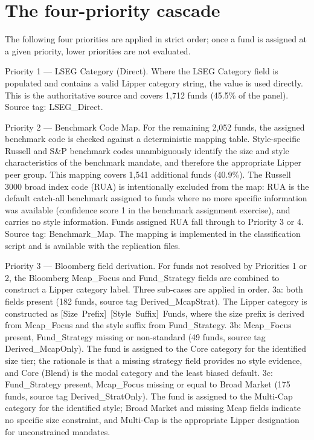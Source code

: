 \documentclass[12pt, oneside]{report}
\begin{document}
\section{The four-priority cascade}
\label{sec:lipper_cascade}

\noindent The following four priorities are applied in strict order;
once a fund is assigned at a given priority, lower priorities are
not evaluated.

Priority 1 --- LSEG Category (Direct). Where the LSEG
Category field is populated and contains a valid Lipper category
string, the value is used directly. This is the authoritative source
and covers 1{,}712 funds (45.5\% of the panel). Source tag:
LSEG\_Direct.

Priority 2 --- Benchmark Code Map. For the remaining 2{,}052
funds, the assigned benchmark code is checked against a deterministic
mapping table. Style-specific Russell and S\&P benchmark codes
unambiguously identify the size and style characteristics of the
benchmark mandate, and therefore the appropriate Lipper peer group.
This mapping covers 1{,}541 additional funds (40.9\%). The Russell
3000 broad index code (RUA) is intentionally excluded from the map:
RUA is the default catch-all benchmark assigned to funds where no
more specific information was available (confidence score 1 in the
benchmark assignment exercise), and carries no style information.
Funds assigned RUA fall through to Priority 3 or 4. Source tag:
Benchmark\_Map. The mapping is implemented in the classification
script and is available with the replication files.

Priority 3 --- Bloomberg field derivation. For funds not
resolved by Priorities 1 or 2, the Bloomberg Mcap\_Focus and
Fund\_Strategy fields are combined to construct a Lipper
category label. Three sub-cases are applied in order. 3a:
both fields present (182 funds, source tag
Derived\_McapStrat). The Lipper category is constructed as
[Size~Prefix]~[Style~Suffix]~Funds, where the size prefix is derived
from Mcap\_Focus and the style suffix from
Fund\_Strategy. 3b: Mcap\_Focus present,
Fund\_Strategy missing or non-standard (49 funds, source tag
Derived\_McapOnly). The fund is assigned to the Core
category for the identified size tier; the rationale is that a
missing strategy field provides no style evidence, and Core (Blend)
is the modal category and the least biased default. 3c:
Fund\_Strategy present, Mcap\_Focus missing or
equal to Broad Market (175 funds, source tag
Derived\_StratOnly). The fund is assigned to the Multi-Cap
category for the identified style; Broad Market and missing Mcap
fields indicate no specific size constraint, and Multi-Cap is the
appropriate Lipper designation for unconstrained mandates.
\end{document}
